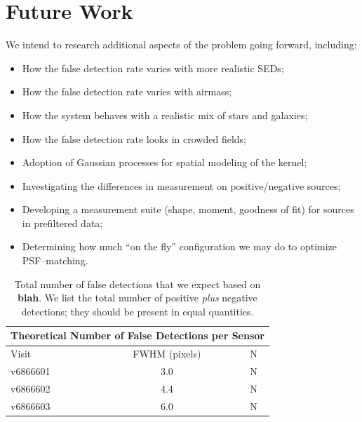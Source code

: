 \documentclass[prd, nofootinbib, floatfix, 11pt,tightenlines,times]{article}
\begin{document}
\section{Future Work}

We intend to research additional aspects of the problem going forward,
including:
\begin{itemize}
\item How the false detection rate varies with more realistic SEDs;
\item How the false detection rate varies with airmass;
\item How the system behaves with a realistic mix of stars and galaxies;
\item How the false detection rate looks in crowded fields;
\item Adoption of Gaussian processes for spatial modeling of the kernel;
\item Investigating the differences in measurement on positive/negative sources;
\item Developing a measurement suite (shape, moment, goodness of fit) for sources in prefiltered data;
\item Determining how much ``on the fly'' configuration we may do to optimize PSF--matching.
\end{itemize}

\clearpage



\clearpage

\begin{table}
\centering
\begin{tabular}{lcc}
\hline
\multicolumn{3}{|c|}{Theoretical Number of False Detections per Sensor} \\
\hline
Visit    & FWHM (pixels) & N\\
\hline
v6866601 & 3.0 & N \\
v6866602 & 4.4 & N \\
v6866603 & 6.0 & N \\
\end{tabular}
\caption{Total number of false detections that we expect based on
  {\bf blah}.  We list the total number of positive {\it plus} negative detections;
  they should be present in equal quantities. \label{tab-fp}
}
\end{table}
\end{document}
